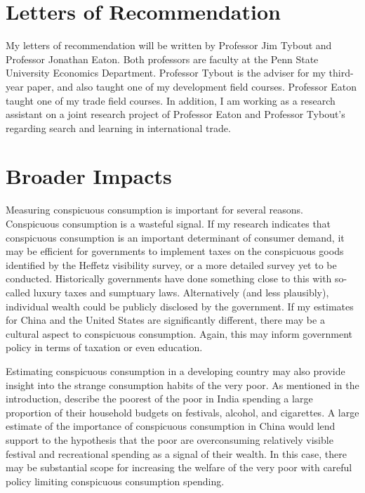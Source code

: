 \documentclass[a4paper,10pt]{article}
\begin{document}
\section{Letters of Recommendation}
My letters of recommendation will be written by Professor Jim Tybout and Professor Jonathan Eaton. Both professors are faculty at the Penn State University Economics Department.  Professor Tybout is the adviser for my third-year paper, and also taught one of my development field courses.  Professor Eaton taught one of my trade field courses.  In addition, I am working as a research assistant on a joint research project of Professor Eaton and Professor Tybout's regarding search and learning in international trade.

\section{Broader Impacts}
Measuring conspicuous consumption is important for several reasons.  Conspicuous consumption is a wasteful signal.  If my research indicates that conspicuous consumption is an important determinant of consumer demand, it may be efficient for governments to implement taxes on the conspicuous goods identified by the Heffetz visibility survey, or a more detailed survey yet to be conducted.  Historically governments have done something close to this with so-called luxury taxes and sumptuary laws.  Alternatively (and less plausibly), individual wealth could be publicly disclosed by the government.  If my estimates for China and the United States are significantly different, there may be a cultural aspect to conspicuous consumption.  Again, this may inform government policy in terms of taxation or even education.

Estimating conspicuous consumption in a developing country may also provide insight into the strange consumption habits of the very poor.  As mentioned in the introduction, \citet{BanerjeeDuflo2007} describe the poorest of the poor in India spending a large proportion of their household budgets on festivals, alcohol, and cigarettes.  A large estimate of the importance of conspicuous consumption in China would lend support to the hypothesis that the poor are overconsuming relatively visible festival and recreational spending as a signal of their wealth.  In this case, there may be substantial scope for increasing the welfare of the very poor with careful policy limiting conspicuous consumption spending.      



\end{document}
